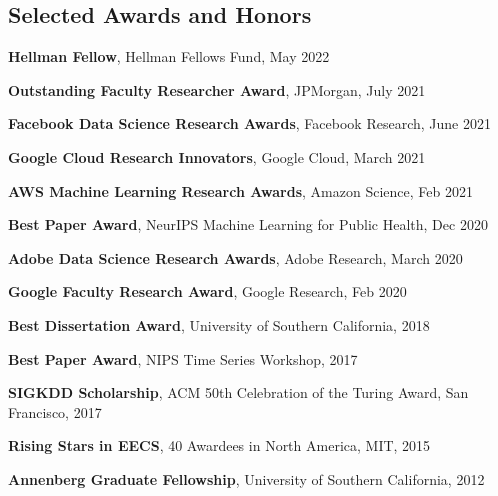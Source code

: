 \documentclass[margin,line]{res}
\newenvironment{list1}{
  \begin{list}{\ding{113}}{%
      \setlength{\itemsep}{0in}
      \setlength{\parsep}{0in} \setlength{\parskip}{0in}
      \setlength{\topsep}{0in} \setlength{\partopsep}{0in} 
      \setlength{\leftmargin}{0.17in}}}{\end{list}}
\begin{document}
\begin{resume}


\section{\sc Selected Awards and Honors} 


\textbf{Hellman Fellow},   Hellman Fellows Fund, May 2022

\textbf{Outstanding Faculty Researcher Award}, JPMorgan, July 2021

  
\textbf{Facebook Data Science Research Awards},  Facebook Research, June 2021


\textbf{Google Cloud Research Innovators}, Google Cloud, March 2021

\textbf{AWS Machine Learning Research Awards},  Amazon Science, Feb 2021

\textbf{Best Paper Award},  NeurIPS Machine Learning for Public Health, Dec 2020

\textbf{Adobe Data Science Research Awards},  Adobe Research, March 2020

\textbf{Google Faculty Research  Award},  Google Research, Feb 2020

\textbf{Best Dissertation Award}, University of Southern California, 2018

\textbf{Best Paper Award},  NIPS Time Series Workshop, 2017

\textbf{SIGKDD Scholarship},  ACM 50th Celebration of the Turing Award, San Francisco, 2017

\textbf{Rising Stars in EECS},  40 Awardees in North America, MIT, 2015

\textbf{Annenberg Graduate Fellowship}, University of Southern California, 2012








\end{resume}
\end{document}
